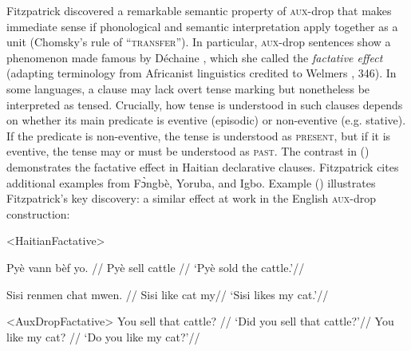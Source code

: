 \documentclass[output=paper]{langscibook}
\begin{document}
Fitzpatrick discovered a remarkable semantic property of \textsc{aux}-drop that makes immediate sense if phonological and semantic interpretation apply together as a unit (Chomsky's \citeyear{Chomsky2001a} rule of ``\textsc{transfer}''). In particular, \textsc{aux}-drop sentences show a phenomenon made famous by Déchaine \citeyearpar{Dechaine1991}, which she called the \textit{factative effect} (adapting terminology from Africanist linguistics credited to Welmers \citeyear{Welmers:1973aa}, 346). In some languages, a clause may lack overt tense marking but nonetheless be interpreted as tensed. Crucially, how tense is understood in such clauses depends on whether its main predicate is eventive (episodic) or non-eventive (e.g. stative). If the predicate is non-eventive, the tense is understood as \textsc{present}, but if it is eventive, the tense may or must be understood as \textsc{past}. The contrast in () demonstrates the factative effect in Haitian declarative clauses. Fitzpatrick cites additional examples from Fɔ̀ngbè, Yoruba, and Igbo. Example () illustrates Fitzpatrick's key discovery: a similar effect at work in the English \textsc{aux}-drop construction:

\pex<HaitianFactative>

\a
\begingl
\gla Pyè vann bèf yo.  {}//
\glb Pyè sell cattle \Det{}//
\glft `Pyè sold the cattle.'//
\endgl

\a
 \begingl
\gla Sisi renmen chat mwen. {}//
\glb Sisi like cat my//
\glft `Sisi likes my cat.'//
\endgl
\xe

\pex[aboveexskip=0pt]
<AuxDropFactative>
\a
\begingl
\gla You sell that cattle? {}//
\glft `Did you sell that cattle?'//
\endgl
\a
\begingl
\gla You like my cat? {}//
\glft `Do you like my cat?'//
\endgl
\xe
\end{document}
